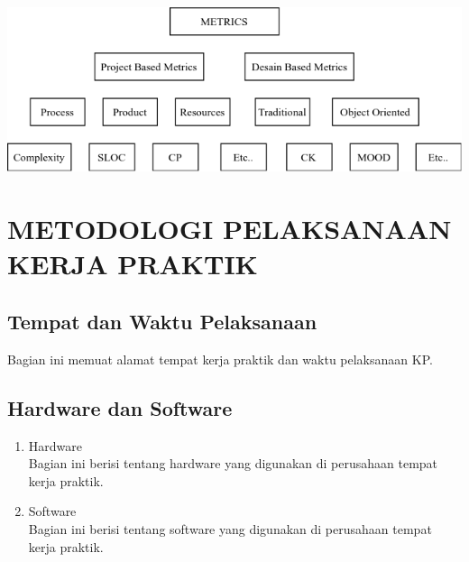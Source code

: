 \documentclass[oneside,listof=totoc]{scrbook}
\begin{document}
\begin{center}
  \begin{minipage}{\textwidth}
    \label{gambar:2.1}
    \includegraphics[width=14.5cm]{gambar/gambar_2.1.png}
    \vspace{-0.5cm}
  \end{minipage}
\end{center}

\chapter{METODOLOGI PELAKSANAAN KERJA PRAKTIK}

\vspace{0.5cm}

\section{Tempat dan Waktu Pelaksanaan}
Bagian ini memuat alamat tempat kerja praktik dan waktu pelaksanaan KP.

\section{Hardware dan Software}
\begin{enumerate}[label=\alph*.]
  \item Hardware\\
  Bagian ini berisi tentang hardware yang digunakan di perusahaan tempat kerja praktik.
  \item Software\\
  Bagian ini berisi tentang software yang digunakan di perusahaan tempat kerja praktik.
\end{enumerate}
\end{document}

